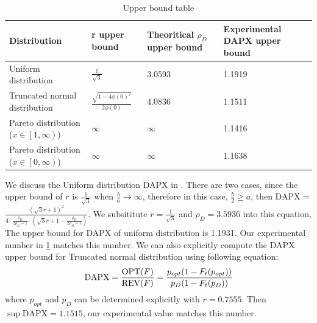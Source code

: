 \begin{center}
	\begin{table}[hbt]
		\begin{tabular}{ | m{3.2cm} | m{2.8cm}| m{3cm} |m{4cm}|  } 
		\hline
		\textbf{Distribution}	&	\textbf{r upper bound}  & \textbf{Theoritical $\rho_D$ upper bound} & 	\textbf{Experimental DAPX upper bound}  \\ 
		\hline
		Uniform distribution&$\frac{1}{\sqrt{3}}$& 3.0593 & 1.1919 \\ 
		\hline
		Truncated normal distribution & $\frac{ \sqrt{1-4\phi(0)^2}}{2\phi(0)}$ & 4.0836& 1.1511 \\ 
		\hline
		 Pareto distribution ($x \in \left[1,\infty \right)$)& $\infty$ & $\infty$& 1.1416 \\
		\hline
		 Pareto distribution ($x \in \left[0,\infty \right)$)& $\infty$ & $\infty$& 1.1638 \\
		\hline
		\end{tabular}
		\caption{Upper bound table}
		\label{tab:dapxbound}
	\end{table}
\end{center}
We discuss the Uniform distribution DAPX in . There are two cases, since the upper bound of $r$ is $\frac{1}{\sqrt{3}}$ when $\frac{b}{a} \rightarrow \infty$, therefore in this case, $\frac{b}{2} \geqslant a$, then DAPX =  $\frac{ ( \sqrt{3}r +1)^{2}}{4 \cdot \frac{ \rho_{D}}{2\rho_{D}-1}\cdot( \sqrt{3}r+ 1-\frac{\rho_{D}}{2\rho_{D}-1})}$. We subsititute $r = \frac{1}{\sqrt{3}}$ and $\rho_D = 3.5936$ into this equation, The upper bound for DAPX of uniform distribution is 1.1931. Our experimental number in \cref{tab:dapxbound} matches this number. We can also explicitly compute the DAPX upper bound for Truncated normal distribution using following equation:
\begin{equation}\notag
\text{DAPX} = \frac{\text{OPT}(F)}{\text{REV}(F)} =\frac{p_{opt}(1-F_t(p_{opt}))} {p_D(1-F_t(p_{D}))} 	
\end{equation} 
where $p_{opt}$ and $p_D$ can be determined explicitly with $r = 0.7555$. Then $\sup \text{DAPX} = 1.1515$, our experimental value matches this number. 


